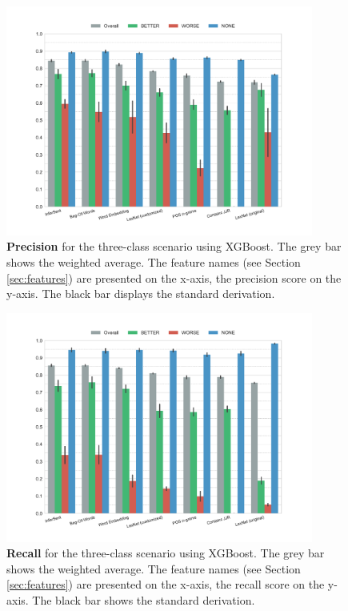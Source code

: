\begin{figure}[p]
         \caption{\textbf{Precision} for the three-class scenario using XGBoost. The grey bar shows the weighted average. The feature names (see Section \ref{sec:features}) are presented on the x-axis, the precision score on the y-axis. The black bar displays the standard derivation.} 
    \label{fig:3_precision}
 \centering
	\includegraphics[width=0.9\textwidth]{images/experiments/precision-False}
\end{figure}

  \begin{figure}[p]
              \caption{\textbf{Recall} for the three-class scenario using XGBoost. The grey bar shows the weighted average. The feature names (see Section \ref{sec:features}) are presented on the x-axis, the recall score on the y-axis. The black bar shows the standard derivation.} 
       \label{fig:3_recall}
 \centering
	\includegraphics[width=0.9\textwidth]{images/experiments/recall-False}
\end{figure}


